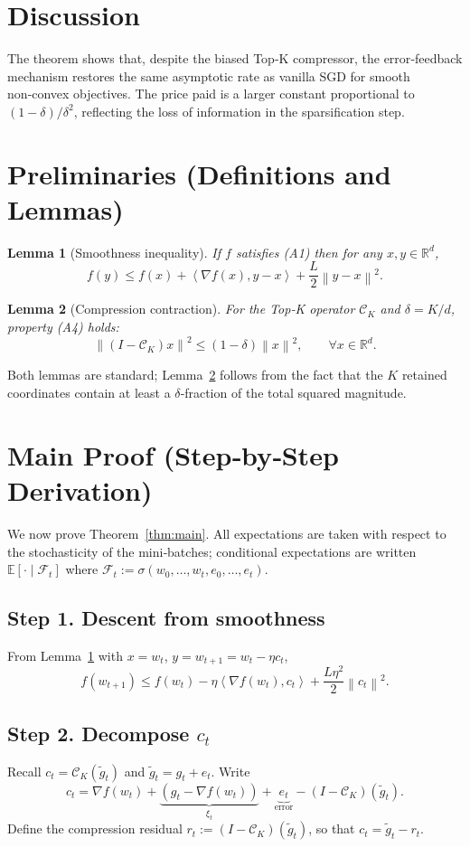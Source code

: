 \documentclass{article}
\newtheorem{lemma}{Lemma}
\newcommand{\E}{\mathbb{E}}
\newcommand{\R}{\mathbb{R}}
\newcommand{\norm}[1]{\left\|#1\right\|}
\newcommand{\inner}[2]{\left\langle #1,#2\right\rangle}
\newcommand{\topk}{\mathcal{C}_K}
\begin{document}
\section*{Discussion}
The theorem shows that, despite the biased Top‑K compressor, the
error‑feedback mechanism restores the same asymptotic rate as vanilla SGD
for smooth non‑convex objectives. The price paid is a larger constant
proportional to $(1-\delta)/\delta^{2}$, reflecting the loss of information
in the sparsification step.

\newpage
\section*{Preliminaries (Definitions and Lemmas)}
\begin{lemma}[Smoothness inequality]\label{lem:smooth}
If $f$ satisfies (A1) then for any $x,y\in\R^{d}$,
\[
f(y)\le f(x)+\inner{\nabla f(x)}{y-x}+\frac{L}{2}\norm{y-x}^{2}.
\]
\end{lemma}
\begin{lemma}[Compression contraction]\label{lem:contract}
For the Top‑K operator $\topk$ and $\delta=K/d$, property (A4) holds:
\[
\norm{(I-\topk)x}^{2}\le(1-\delta)\norm{x}^{2},\qquad\forall x\in\R^{d}.
\]
\end{lemma}
Both lemmas are standard; Lemma~\ref{lem:contract} follows from the fact
that the $K$ retained coordinates contain at least a $\delta$‑fraction of the
total squared magnitude.

\section*{Main Proof (Step‑by‑Step Derivation)}
We now prove Theorem~\ref{thm:main}.  All expectations are taken with
respect to the stochasticity of the mini‑batches; conditional expectations are
written $\E[\cdot\mid\mathcal{F}_t]$ where $\mathcal{F}_t:=\sigma(w_0,\dots,w_t,
e_0,\dots,e_t)$.

\subsection*{Step 1. Descent from smoothness}
From Lemma~\ref{lem:smooth} with $x=w_t$, $y=w_{t+1}=w_t-\eta c_t$,
\[
f(w_{t+1})\le f(w_t)-\eta\inner{\nabla f(w_t)}{c_t}
               +\frac{L\eta^{2}}{2}\norm{c_t}^{2}.
\tag{S1}
\]

\subsection*{Step 2. Decompose $c_t$}
Recall $c_t=\topk(\tilde g_t)$ and $\tilde g_t=g_t+e_t$.
Write
\[
c_t = \nabla f(w_t) + \underbrace{(g_t-\nabla f(w_t))}_{\xi_t}
      + \underbrace{e_t}_{\text{error}} - (I-\topk)(\tilde g_t).
\tag{S2}
\]
Define the compression residual $r_t:=(I-\topk)(\tilde g_t)$, so that
$c_t = \tilde g_t - r_t$.
\end{document}
